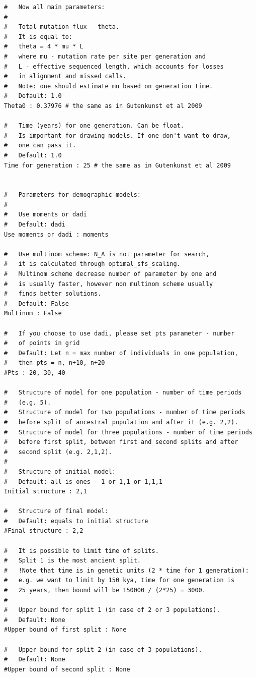 \documentclass[12pt]{article}
\begin{document}
\begin{appendices}
\begin{lstlisting}
#   Now all main parameters:
#
#   Total mutation flux - theta.
#   It is equal to:
#   theta = 4 * mu * L
#   where mu - mutation rate per site per generation and 
#   L - effective sequenced length, which accounts for losses 
#   in alignment and missed calls.
#   Note: one should estimate mu based on generation time.
#   Default: 1.0
Theta0 : 0.37976 # the same as in Gutenkunst et al 2009

#   Time (years) for one generation. Can be float. 
#   Is important for drawing models. If one don't want to draw, 
#   one can pass it.
#   Default: 1.0
Time for generation : 25 # the same as in Gutenkunst et al 2009


#   Parameters for demographic models:
#
#   Use moments or dadi
#   Default: dadi
Use moments or dadi : moments

#   Use multinom scheme: N_A is not parameter for search, 
#   it is calculated through optimal_sfs_scaling.
#   Multinom scheme decrease number of parameter by one and 
#   is usually faster, however non multinom scheme usually 
#   finds better solutions.
#   Default: False
Multinom : False

#   If you choose to use dadi, please set pts parameter - number
#   of points in grid
#   Default: Let n = max number of individuals in one population, 
#   then pts = n, n+10, n+20
#Pts : 20, 30, 40

#   Structure of model for one population - number of time periods 
#   (e.g. 5).
#   Structure of model for two populations - number of time periods
#   before split of ancestral population and after it (e.g. 2,2).
#   Structure of model for three populations - number of time periods
#   before first split, between first and second splits and after 
#   second split (e.g. 2,1,2).
#
#   Structure of initial model:
#   Default: all is ones - 1 or 1,1 or 1,1,1
Initial structure : 2,1

#   Structure of final model:
#   Default: equals to initial structure
#Final structure : 2,2

#   It is possible to limit time of splits.
#   Split 1 is the most ancient split.
#   !Note that time is in genetic units (2 * time for 1 generation):
#   e.g. we want to limit by 150 kya, time for one generation is 
#   25 years, then bound will be 150000 / (2*25) = 3000.
#
#   Upper bound for split 1 (in case of 2 or 3 populations).
#   Default: None
#Upper bound of first split : None

#   Upper bound for split 2 (in case of 3 populations).
#   Default: None
#Upper bound of second split : None


\end{lstlisting}
\end{appendices}
\end{document}
